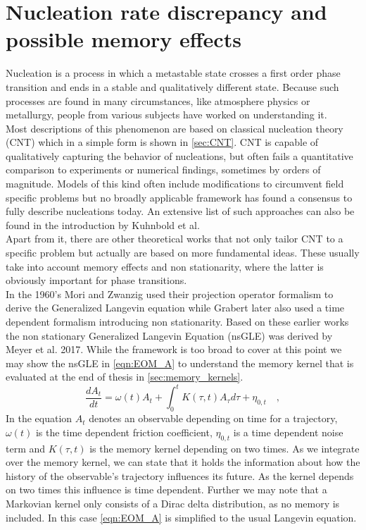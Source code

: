 \section{Nucleation rate discrepancy and possible memory effects}
\label{sec:memory_approach}
Nucleation is a process in which a metastable state crosses a first order phase transition and ends in a stable and qualitatively different state. Because such processes are found in many circumstances, like atmosphere physics or metallurgy, people from various subjects have worked on understanding it.\\

Most descriptions of this phenomenon are based on classical nucleation theory (CNT) which in a simple form is shown in \autoref{sec:CNT}. CNT is capable of qualitatively capturing the behavior of nucleations, but often fails a quantitative comparison to experiments or numerical findings, sometimes by orders of magnitude. Models of this kind often include modifications to circumvent field specific problems but no broadly applicable framework has found a consensus to fully describe nucleations today\cite{MeyerThesis}. An extensive list of such approaches can also be found in the introduction by Kuhnbold et al.\cite{Kuhnbold2019}\\

Apart from it, there are other theoretical works that not only tailor CNT to a specific problem but actually are based on more fundamental ideas. These usually take into account memory effects and non stationarity, where the latter is obviously important for phase transitions.\\

In the 1960's Mori and Zwanzig used their projection operator formalism to derive the Generalized Langevin equation while Grabert later also used a time dependent formalism introducing non stationarity. Based on these earlier works the non stationary Generalized Langevin Equation (nsGLE) was derived by Meyer et al. 2017\cite{Meyer_nsGLE}. While the framework is too broad to cover at this point we may show the nsGLE in \autoref{eqn:EOM_A} to understand the memory kernel that is evaluated at the end of thesis in \autoref{sec:memory_kernels}.
\begin{equation}
\label{eqn:EOM_A}
  \frac{d A_{t}}{dt} = \omega (t) A_{t} + \int_{0}^{t} K(\tau, t) A_{\tau} d\tau + \eta_{0,t} \quad ,
\end{equation}
In the equation $A_{t}$ denotes an observable depending on time for a trajectory, $\omega (t)$ is the time dependent friction coefficient, $\eta_{0,t}$ is a time dependent noise term and $K(\tau, t)$ is the memory kernel depending on two times. As we integrate over the memory kernel, we can state that it holds the information about how the history of the observable's trajectory influences its future. As the kernel depends on two times this influence is time dependent. Further we may note that a Markovian kernel only consists of a Dirac delta distribution, as no memory is included. In this case \autoref{eqn:EOM_A} is simplified to the usual Langevin equation.\\

